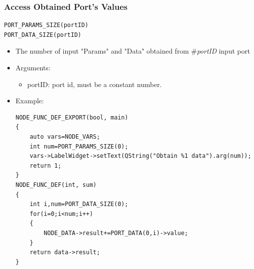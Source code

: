 \documentclass[a4paper,10pt]{book}
\begin{document}
\subsubsection{Access Obtained Port's Values}

\begin{mdframed}
\begin{verbatim}
PORT_PARAMS_SIZE(portID)
PORT_DATA_SIZE(portID)
\end{verbatim}
\begin{itemize}
 \item The number of input "Params" and "Data" obtained from \#{\em{portID}} input port
 \item Arguments:
 \begin{itemize}
  \item portID: port id, must be a constant number.
 \end{itemize}
 \item Example:
 \begin{verbatim}
NODE_FUNC_DEF_EXPORT(bool, main)
{
    auto vars=NODE_VARS;
    int num=PORT_PARAMS_SIZE(0);
    vars->LabelWidget->setText(QString("Obtain %1 data").arg(num));
    return 1;
}
NODE_FUNC_DEF(int, sum)
{
    int i,num=PORT_DATA_SIZE(0);
    for(i=0;i<num;i++)
    {
        NODE_DATA->result+=PORT_DATA(0,i)->value;
    }
    return data->result;
}
 \end{verbatim}
\end{itemize}
\end{mdframed}
\end{document}
